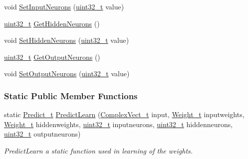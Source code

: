 \begin{DoxyCompactItemize}
\item 
void \hyperlink{class_soil_math_1_1_n_n_a3a08c0f82d5f57895ccd28ae0a6274a3}{Set\+Input\+Neurons} (\hyperlink{_soil_math_types_8h_a435d1572bf3f880d55459d9805097f62}{uint32\+\_\+t} value)
\item 
\hyperlink{_soil_math_types_8h_a435d1572bf3f880d55459d9805097f62}{uint32\+\_\+t} \hyperlink{class_soil_math_1_1_n_n_a72a24fe997d16dea985f1a8c4ea24196}{Get\+Hidden\+Neurons} ()
\item 
void \hyperlink{class_soil_math_1_1_n_n_ad4fd78afb9c34634464548c0196d2346}{Set\+Hidden\+Neurons} (\hyperlink{_soil_math_types_8h_a435d1572bf3f880d55459d9805097f62}{uint32\+\_\+t} value)
\item 
\hyperlink{_soil_math_types_8h_a435d1572bf3f880d55459d9805097f62}{uint32\+\_\+t} \hyperlink{class_soil_math_1_1_n_n_ad993359d249d3a2a91d998df3cd7d85a}{Get\+Output\+Neurons} ()
\item 
void \hyperlink{class_soil_math_1_1_n_n_a3fc439de707dde0ba6a55d2941bd898b}{Set\+Output\+Neurons} (\hyperlink{_soil_math_types_8h_a435d1572bf3f880d55459d9805097f62}{uint32\+\_\+t} value)
\end{DoxyCompactItemize}
\subsubsection*{Static Public Member Functions}
\begin{DoxyCompactItemize}
\item 
static \hyperlink{_soil_math_types_8h_aaeba766195a440b2539f0438d3d41f95}{Predict\+\_\+t} \hyperlink{class_soil_math_1_1_n_n_ac758bdef758439af30a62c486dff79ca}{Predict\+Learn} (\hyperlink{_soil_math_types_8h_a7567e521c2b2c408dcb62dbff72390f7}{Complex\+Vect\+\_\+t} input, \hyperlink{_soil_math_types_8h_ac56ad2b88186620fd0de0d213aa715dd}{Weight\+\_\+t} inputweights, \hyperlink{_soil_math_types_8h_ac56ad2b88186620fd0de0d213aa715dd}{Weight\+\_\+t} hiddenweights, \hyperlink{_soil_math_types_8h_a435d1572bf3f880d55459d9805097f62}{uint32\+\_\+t} inputneurons, \hyperlink{_soil_math_types_8h_a435d1572bf3f880d55459d9805097f62}{uint32\+\_\+t} hiddenneurons, \hyperlink{_soil_math_types_8h_a435d1572bf3f880d55459d9805097f62}{uint32\+\_\+t} outputneurons)
\begin{DoxyCompactList}\small\item\em Predict\+Learn a static function used in learning of the weights. \end{DoxyCompactList}\end{DoxyCompactItemize}
